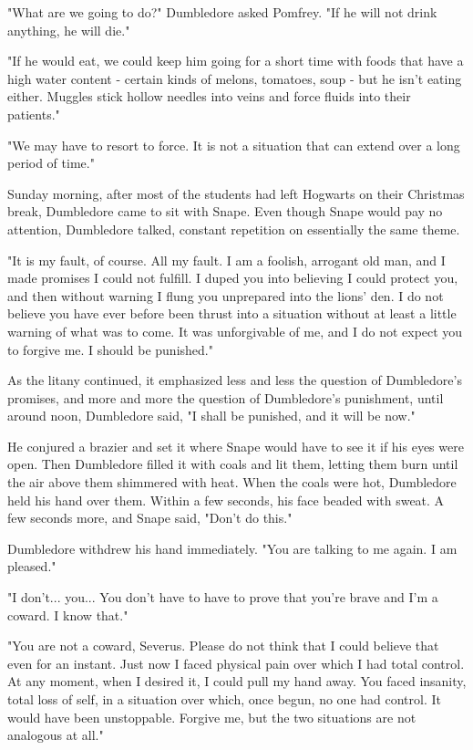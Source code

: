 "What are we going to do?" Dumbledore asked Pomfrey. "If he will not drink anything, he will die."

"If he would eat, we could keep him going for a short time with foods that have a high water content - certain kinds of melons, tomatoes, soup - but he isn't eating either. Muggles stick hollow needles into veins and force fluids into their patients."

"We may have to resort to force. It is not a situation that can extend over a long period of time."

Sunday morning, after most of the students had left Hogwarts on their Christmas break, Dumbledore came to sit with Snape. Even though Snape would pay no attention, Dumbledore talked, constant repetition on essentially the same theme.

"It is my fault, of course. All my fault. I am a foolish, arrogant old man, and I made promises I could not fulfill. I duped you into believing I could protect you, and then without warning I flung you unprepared into the lions' den. I do not believe you have ever before been thrust into a situation without at least a little warning of what was to come. It was unforgivable of me, and I do not expect you to forgive me. I should be punished."

As the litany continued, it emphasized less and less the question of Dumbledore's promises, and more and more the question of Dumbledore's punishment, until around noon, Dumbledore said, "I shall be punished, and it will be now."

He conjured a brazier and set it where Snape would have to see it if his eyes were open. Then Dumbledore filled it with coals and lit them, letting them burn until the air above them shimmered with heat. When the coals were hot, Dumbledore held his hand over them. Within a few seconds, his face beaded with sweat. A few seconds more, and Snape said, "Don't do this."

Dumbledore withdrew his hand immediately. "You are talking to me again. I am pleased."

"I don't... you... You don't have to have to prove that you're brave and I'm a coward. I know that."

"You are not a coward, Severus. Please do not think that I could believe that even for an instant. Just now I faced physical pain over which I had total control. At any moment, when I desired it, I could pull my hand away. You faced insanity, total loss of self, in a situation over which, once begun, no one had control. It would have been unstoppable. Forgive me, but the two situations are not analogous at all."

